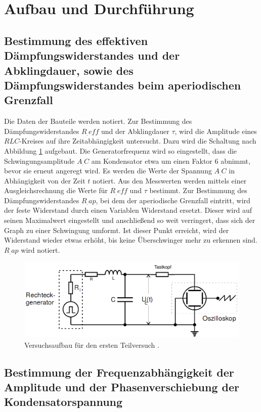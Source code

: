 
\section{Aufbau und Durchführung}
\label{sec:Durchführung}

\subsection{Bestimmung des effektiven Dämpfungswiderstandes und der Abklingdauer, sowie des Dämpfungswiderstandes beim aperiodischen Grenzfall}

Die Daten der Bauteile werden notiert.
Zur Bestimmung des Dämpfungswiderstandes $R_.{eff}$ und der Abklingdauer $\tau$, wird die Amplitude eines $RLC$-Kreises auf ihre Zeitabhängigkeit untersucht. Dazu wird die Schaltung nach Abbildung \ref{fig:Aufgabea} aufgebaut. Die Generatorfrequenz wird so eingestellt, dass die Schwingungsamplitude $A_.C$ am Kondensator etwa um einen Faktor 6 abnimmt, bevor sie erneut angeregt wird. Es werden die Werte der Spannung $A_.C$ in Abhängigkeit von der Zeit $t$ notiert. Aus den Messwerten werden mittels einer Ausgleichsrechnung die Werte für $R_.{eff}$ und $\tau$ bestimmt.\newline
Zur Bestimmung des Dämpfungswiderstandes $R_.{ap}$, bei dem der aperiodische Grenzfall eintritt, wird der feste Widerstand durch einen Variablen Widerstand ersetzt. Dieser wird auf seinen Maximalwert eingestellt und anschließend so weit verringert, dass sich der Graph zu einer Schwingung umformt. Ist dieser Punkt erreicht, wird der Widerstand wieder etwas erhöht, bis keine Überschwinger mehr zu erkennen sind. $R_.{ap}$ wird notiert.

\begin{figure}
\centering
\includegraphics[width=\linewidth-200pt,height=\textheight-200pt,keepaspectratio]{content/images/Aufgabea.png}
\caption{Versuchsaufbau für den ersten Teilversuch \cite{V354}.}
\label{fig:Aufgabea}
\end{figure}

\subsection{Bestimmung der Frequenzabhängigkeit der Amplitude und der Phasenverschiebung der Kondensatorspannung}

